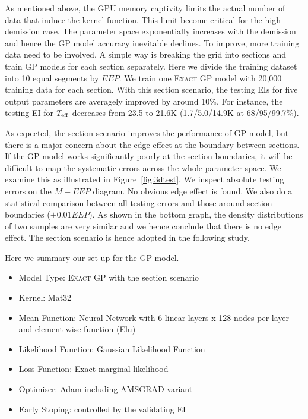 As mentioned above, the GPU memory captivity limits the actual number of data that induce the kernel function.   
This limit become critical for the high-demission case. The parameter space exponentially increases with the demission and hence the GP model accuracy inevitable declines. To improve, more training data need to be involved. 
%
A simple way is breaking the grid into sections and train GP models for each section separately. 
Here we divide the training dataset into 10 equal segments by $EEP$. We train one \textsc{Exact GP} model with 20,000 training data for each section. 
With this section scenario, the testing EIs for five output parameters are averagely improved by around 10\%. For instance, the testing EI for $T_{\rm eff}$ decreases from 23.5 to 21.6K (1.7/5.0/14.9K at 68/95/99.7\%). 
%

As expected, the section scenario improves the performance of GP model, but there is a major concern about the edge effect at the boundary between sections. If the GP model works significantly poorly at the section boundaries, it will be difficult to map the systematic errors across the whole parameter space. We examine this as illustrated in Figure~\ref{fig:3dtest}. We inspect absolute testing errors on the $M-EEP$ diagram. No obvious edge effect is found. We also do a statistical comparison between all testing errors and those around section boundaries ($\pm0.01EEP$). As shown in the bottom graph, the density distributions of two samples are very similar and we hence conclude that there is no edge effect. The section scenario is hence adopted in the following study.  

Here we summary our set up for the GP model.
\begin{itemize}
\item Model Type: \textsc{Exact GP} with the section scenario 
\item Kernel: Mat32 %
\item Mean Function: Neural Network with 6 linear layers x 128 nodes per layer and element-wise function (Elu) 
\item Likelihood Function: Gaussian Likelihood Function
\item Loss Function: Exact marginal likelihood
\item Optimiser: Adam including AMSGRAD variant
\item Early Stoping: controlled by the validating EI
\end{itemize}







     





